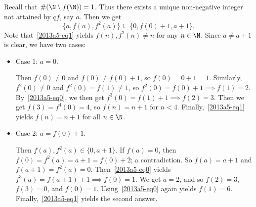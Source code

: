 Recall that $\#(\N \setminus f(\N)) = 1$.
Thus there exists a unique non-negative integer not attained by ç$f$, say $a$.
Then we get
\[ \{a, f(a), f^2(a)\} \subseteq \{0, f(0) + 1, a + 1\}. \]
Note that~\eqref{2013a5-eq1} yields $f(n), f^2(n) \neq n$ for any $n \in \N$.
Since $a \neq a + 1$ is clear, we have two cases:

\begin{itemize}

    \item
    Case 1: $a = 0$.

    Then $f(0) \neq 0$ and $f(0) \neq f(0) + 1$, so $f(0) = 0 + 1 = 1$.
    Similarly, $f^2(0) \neq 0$ and $f^2(0) = f(1) \neq 1$, so $f^2(0) = f(0) + 1 \implies f(1) = 2$.
    By~\eqref{2013a5-eq0}, we then get $f^3(0) = f(1) + 1 \implies f(2) = 3$.
    Then we get $f(3) = f^4(0) = 4$, so $f(n) = n + 1$ for $n < 4$.
    Finally,~\eqref{2013a5-eq1} yields $f(n) = n + 1$ for all $n \in \N$.

    \item
    Case 2: $a = f(0) + 1$.

    Then $f(a), f^2(a) \in \{0, a + 1\}$.
    If $f(a) = 0$, then $f(0) = f^2(a) = a + 1 = f(0) + 2$; a contradiction.
    So $f(a) = a + 1$ and $f(a + 1) = f^2(a) = 0$.
    Then~\eqref{2013a5-eq0} yields $f^3(a) = f(a + 1) + 1 \implies f(0) = 1$.
    We get $a = 2$, and so $f(2) = 3$, $f(3) = 0$, and $f(0) = 1$.
    Using~\eqref{2013a5-eq0} again yields $f(1) = 6$.
    Finally,~\eqref{2013a5-eq1} yields the second answer.

\end{itemize}
